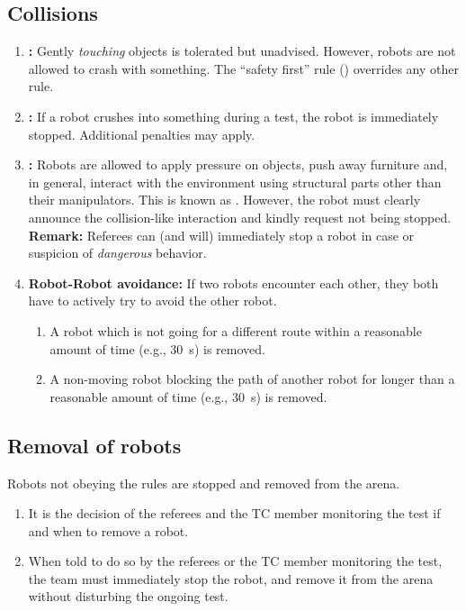\subsection{Collisions}
\begin{enumerate}
	\item \textbf{:} Gently \emph{touching} objects is tolerated but unadvised.
	However, robots are not allowed to crash with something.
	The \enquote{safety first} rule () overrides any other rule.

	\item \textbf{:} If a robot crushes into something during a test, the robot is immediately stopped.	Additional penalties may apply.

	\item \textbf{:} Robots are allowed to apply pressure on objects, push away furniture and, in general, interact with the environment using structural parts other than their manipulators.
	This is known as .
	However, the robot must clearly announce the collision-like interaction and kindly request not being stopped.\\
	\textbf{Remark: } Referees can (and will) immediately stop a robot in case or suspicion of \emph{dangerous} behavior.

	\item \textbf{Robot-Robot avoidance:} If two robots encounter each other, they both have to actively try to avoid the other robot.
	\begin{enumerate}
		\item A robot which is not going for a different route within a reasonable amount of time (e.g., \SI{30}{\second}) is removed.
		\item A non-moving robot blocking the path of another robot for longer than a reasonable amount of time (e.g., \SI{30}{\second}) is removed.
	\end{enumerate}
\end{enumerate}



\subsection{Removal of robots}
\label{rule:robot_removal}
Robots not obeying the rules are stopped and removed from the arena.
\begin{enumerate}
	\item It is the decision of the referees and the TC member monitoring the test if and when to remove a robot.
	\item When told to do so by the referees or the TC member monitoring the test, the team must immediately stop the robot, and remove it from the arena without disturbing the ongoing test.
\end{enumerate}


